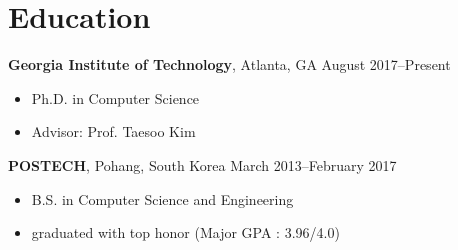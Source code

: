 \section*{Education}

\begin{description}
\item {\bf Georgia Institute of Technology}, Atlanta, GA \dotfill August 2017--Present
  \begin{itemize}
  \item Ph.D. in Computer Science 
  \item Advisor: Prof. Taesoo Kim
  \end{itemize}
  
\item {\bf POSTECH}, Pohang, South Korea \dotfill March 2013--February 2017
  \begin{itemize}
  \item B.S. in Computer Science and Engineering
  \item graduated with top honor (Major GPA : 3.96/4.0)
  \end{itemize}

\end{description}

